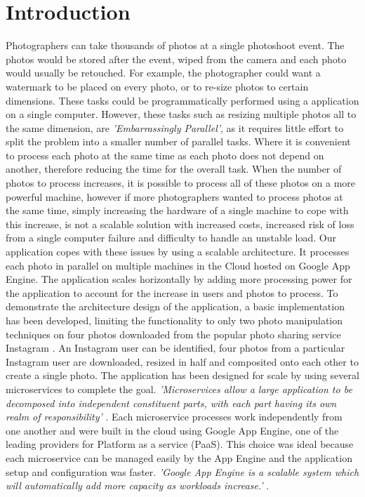 \documentclass[conference]{IEEEtran}
\begin{document}
\section{Introduction}
Photographers can take thousands of photos at a single photoshoot event. The photos would be stored after the event, wiped from the camera and each photo would usually be retouched. For example, the photographer could want a watermark to be placed on every photo, or to re-size photos to certain dimensions. These tasks could be programmatically performed using a  application on a single computer. However, these tasks such as resizing multiple photos all to the same dimension, are \emph{'Embarrassingly Parallel'}, as it requires little effort to split the problem into a smaller number of parallel tasks. Where it is convenient to process each photo at the same time as each photo does not depend on another, therefore reducing the time for the overall task. When the number of photos to process increases, it is possible to process all of these photos on a more powerful machine, however if more photographers wanted to process photos at the same time, simply increasing the hardware of a single machine to cope with this increase, is not a scalable solution with increased costs, increased risk of loss from a single computer failure and difficulty to handle an unstable load. Our application copes with these issues by using a scalable architecture. It processes each photo in parallel on multiple machines in the Cloud hosted on Google App Engine. The application scales horizontally by adding more processing power for the application to account for the increase in users and photos to process.\newline
\newline
To demonstrate the architecture design of the application, a basic implementation has been developed, limiting the functionality to only two photo manipulation techniques on four photos downloaded from the popular photo sharing service Instagram \cite{instagram:api}. An Instagram user can be identified, four photos from a particular Instagram user are downloaded, resized in half and composited onto each other to create a single photo.\newline
\newline
The application has been designed for scale by using several microservices to complete the goal. \emph{'Microservices allow a large application to be decomposed into independent constituent parts, with each part having its own realm of responsibility'} \cite{gae:ms}. Each microservice processes work independently from one another and were built in the cloud using Google App Engine, one of the leading providers for Platform as a service (PaaS). This choice was ideal because each microservice can be managed easily by the App Engine and the application setup and configuration was faster. \emph{'Google App Engine is a scalable system which will automatically add more capacity as workloads increase.'} \cite{gae:scalability}.
\end{document}

